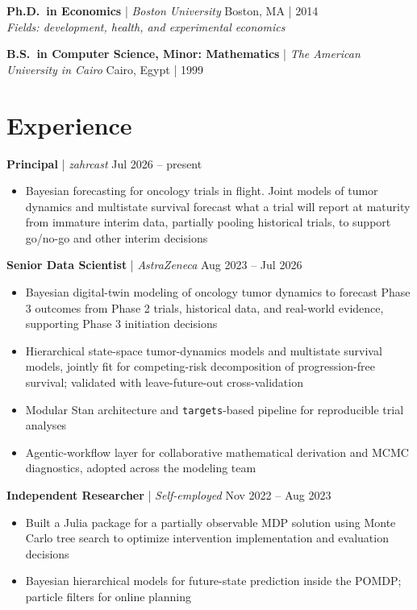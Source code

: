 \documentclass[11pt]{article}
\begin{document}
\textbf{Ph.D.\ in Economics} | \textit{Boston University} \hfill Boston, MA | 2014\\
\textit{Fields: development, health, and experimental economics}

\medskip

\textbf{B.S.\ in Computer Science, Minor: Mathematics} | \textit{The American University in Cairo} \hfill Cairo, Egypt | 1999

\section*{Experience}

\textbf{Principal} | \textit{zahrcast} \hfill Jul 2026 -- present
\begin{itemize}
  \item Bayesian forecasting for oncology trials in flight. Joint models of tumor dynamics and multistate survival forecast what a trial will report at maturity from immature interim data, partially pooling historical trials, to support go/no-go and other interim decisions
\end{itemize}

\medskip

\textbf{Senior Data Scientist} | \textit{AstraZeneca} \hfill Aug 2023 -- Jul 2026
\begin{itemize}
  \item Bayesian digital-twin modeling of oncology tumor dynamics to forecast Phase 3 outcomes from Phase 2 trials, historical data, and real-world evidence, supporting Phase 3 initiation decisions
  \item Hierarchical state-space tumor-dynamics models and multistate survival models, jointly fit for competing-risk decomposition of progression-free survival; validated with leave-future-out cross-validation
  \item Modular Stan architecture and \texttt{targets}-based pipeline for reproducible trial analyses
  \item Agentic-workflow layer for collaborative mathematical derivation and MCMC diagnostics, adopted across the modeling team
\end{itemize}

\medskip

\textbf{Independent Researcher} | \textit{Self-employed} \hfill Nov 2022 -- Aug 2023
\begin{itemize}
  \item Built a Julia package for a partially observable MDP solution using Monte Carlo tree search to optimize intervention implementation and evaluation decisions
  \item Bayesian hierarchical models for future-state prediction inside the POMDP; particle filters for online planning
\end{itemize}
\end{document}
